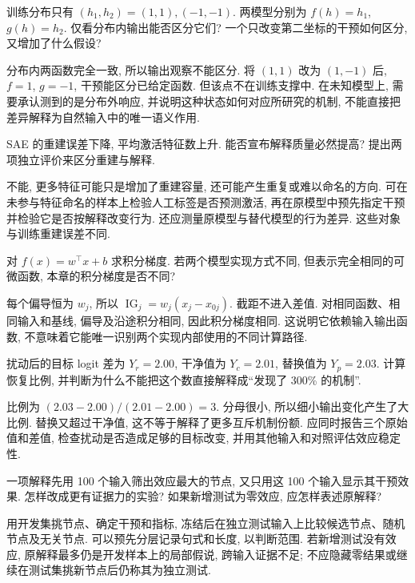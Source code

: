 \begin{exercise}
训练分布只有 $(h_1,h_2)=(1,1),(-1,-1)$. 两模型分别为 $f(h)=h_1$, $g(h)=h_2$. 仅看分布内输出能否区分它们? 一个只改变第二坐标的干预如何区分, 又增加了什么假设?
\end{exercise}
\begin{solution}
分布内两函数完全一致, 所以输出观察不能区分. 将 $(1,1)$ 改为 $(1,-1)$ 后, $f=1$, $g=-1$, 干预能区分已给定函数. 但该点不在训练支撑中. 在未知模型上, 需要承认测到的是分布外响应, 并说明这种状态如何对应所研究的机制, 不能直接把差异解释为自然输入中的唯一语义作用.
\end{solution}
\begin{exercise}
SAE 的重建误差下降, 平均激活特征数上升. 能否宣布解释质量必然提高? 提出两项独立评价来区分重建与解释.
\end{exercise}
\begin{solution}
不能, 更多特征可能只是增加了重建容量, 还可能产生重复或难以命名的方向. 可在未参与特征命名的样本上检验人工标签是否预测激活, 再在原模型中预先指定干预并检验它是否按解释改变行为. 还应测量原模型与替代模型的行为差异. 这些对象与训练重建误差不同.
\end{solution}
\begin{exercise}
对 $f(x)=w^\top x+b$ 求积分梯度. 若两个模型实现方式不同, 但表示完全相同的可微函数, 本章的积分梯度是否不同?
\end{exercise}
\begin{solution}
每个偏导恒为 $w_j$, 所以 $\operatorname{IG}_j=w_j(x_j-x_{0j})$. 截距不进入差值. 对相同函数、相同输入和基线, 偏导及沿途积分相同, 因此积分梯度相同. 这说明它依赖输入输出函数, 不意味着它能唯一识别两个实现内部使用的不同计算路径.
\end{solution}
\begin{exercise}
扰动后的目标 logit 差为 $Y_r=2.00$, 干净值为 $Y_c=2.01$, 替换值为 $Y_p=2.03$. 计算恢复比例, 并判断为什么不能把这个数直接解释成“发现了 300\% 的机制”.
\end{exercise}
\begin{solution}
比例为 $(2.03-2.00)/(2.01-2.00)=3$. 分母很小, 所以细小输出变化产生了大比例. 替换又超过干净值, 这不等于解释了更多互斥机制份额. 应同时报告三个原始值和差值, 检查扰动是否造成足够的目标改变, 并用其他输入和对照评估效应稳定性.
\end{solution}
\begin{exercise}
一项解释先用 100 个输入筛出效应最大的节点, 又只用这 100 个输入显示其干预效果. 怎样改成更有证据力的实验? 如果新增测试为零效应, 应怎样表述原解释?
\end{exercise}
\begin{solution}
用开发集挑节点、确定干预和指标, 冻结后在独立测试输入上比较候选节点、随机节点及无关节点. 可以预先分层记录句式和长度, 以判断范围. 若新增测试没有效应, 原解释最多仍是开发样本上的局部假说, 跨输入证据不足; 不应隐藏零结果或继续在测试集挑新节点后仍称其为独立测试.
\end{solution}
\label{ch:end:12}
